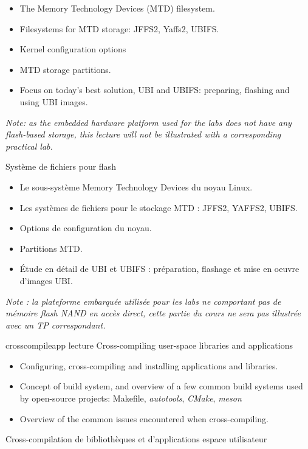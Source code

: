 {
  \begin{itemize}
  \item The Memory Technology Devices (MTD) filesystem.
  \item Filesystems for MTD storage: JFFS2, Yaffs2, UBIFS.
  \item Kernel configuration options
  \item MTD storage partitions.
  \item Focus on today's best solution, UBI and UBIFS:
	preparing, flashing and using UBI images.
  \end{itemize}

  \vspace{0.5cm}

  {\em Note: as the embedded hardware platform used for the labs does
    not have any flash-based storage, this lecture will not be
    illustrated with a corresponding practical lab.}
}
{Système de fichiers pour flash}
{
  \begin{itemize}
  \item Le sous-système Memory Technology Devices du noyau Linux.
  \item Les systèmes de fichiers pour le stockage MTD : JFFS2, YAFFS2,
    UBIFS.
  \item Options de configuration du noyau.
  \item Partitions MTD.
  \item Étude en détail de UBI et UBIFS : préparation, flashage et mise
    en oeuvre d'images UBI.
  \end{itemize}

  \vspace{0.5cm}

  {\em Note : la plateforme embarquée utilisée pour les labs ne
    comportant pas de mémoire flash NAND en accès direct, cette partie
    du cours ne sera pas illustrée avec un TP correspondant.}
}
{crosscompileapp}
{lecture}
{Cross-compiling user-space libraries and applications}
{
  \begin{itemize}
  \item Configuring, cross-compiling and installing applications and
    libraries.
  \item Concept of build system, and overview of a few common build
    systems used by open-source projects: Makefile, {\em autotools},
    {\em CMake}, {\em meson}
  \item Overview of the common issues encountered when
    cross-compiling.
  \end{itemize}
}
{Cross-compilation de bibliothèques et d'applications espace utilisateur}
